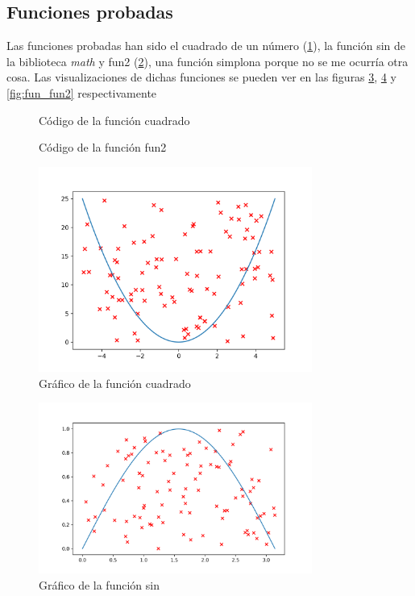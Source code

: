 \documentclass[6pt]{../../shared/AiTex}
\begin{document}
\subsection{Funciones probadas}

Las funciones probadas han sido el \textcolor{codepurple}{cuadrado} de un número (\ref{fig:cuadrado}), la función \textcolor{codepurple}{sin} de la biblioteca \textit{math} y \textcolor{codepurple}{fun2} (\ref{fig:fun2}), una función simplona porque no se me ocurría otra cosa. Las visualizaciones de dichas funciones se pueden ver en las figuras \ref{fig:fun_cuadrado}, \ref{fig:fun_seno} y \ref{fig:fun_fun2} respectivamente

\begin{figure}[H]
    \centering
    
    \caption{Código de la función cuadrado}
    \label{fig:cuadrado}
\end{figure}

\begin{figure}[H]
    \centering
    
    \caption{Código de la función fun2}
    \label{fig:fun2}
\end{figure}

\begin{figure}[H]
    \centering
    \includegraphics[width=0.8\textwidth]{./imagenes/cuadrado.png}
    \caption{Gráfico de la función cuadrado}
    \label{fig:fun_cuadrado}
\end{figure}

\begin{figure}[H]
    \centering
    \includegraphics[width=0.8\textwidth]{./imagenes/sin.png}
    \caption{Gráfico de la función sin}
    \label{fig:fun_seno}
\end{figure}
\end{document}
